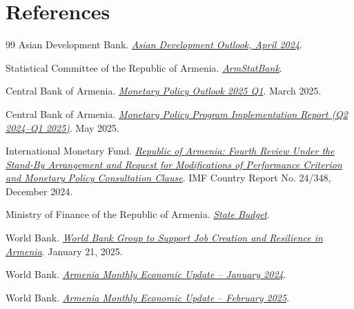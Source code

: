 \documentclass[12pt,a4paper]{report}
\begin{document}
\chapter*{References}
\begin{thebibliography}{99}
Asian Development Bank.
\href{https://www.adb.org/sites/default/files/publication/957856/asian-development-outlook-april-2024.pdf}{\textit{Asian Development Outlook, April 2024}}.

Statistical Committee of the Republic of Armenia.
\href{https://statbank.armstat.am/pxweb/en/ArmStatBank/}{\textit{ArmStatBank}}.

Central Bank of Armenia.
\href{https://www.cba.am/file_manager/Inflation-reports./MPR_2025Q1_Eng.pdf}{\textit{Monetary Policy Outlook 2025 Q1}}.
March 2025.

Central Bank of Armenia.
\href{https://www.cba.am/en/reports/8463}{\textit{Monetary Policy Program Implementation Report (Q2 2024--Q1 2025)}}.
May 2025.

International Monetary Fund.
\href{https://www.imf.org/en/Publications/CR/Issues/2024/12/17/Republic-of-Armenia-Fourth-Review-Under-the-Stand-By-Arrangement-and-Request-for-559673}{\textit{Republic of Armenia: Fourth Review Under the Stand-By Arrangement and Request for Modifications of Performance Criterion and Monetary Policy Consultation Clause}}.
IMF Country Report No. 24/348, December 2024.

Ministry of Finance of the Republic of Armenia.
\href{https://www.minfin.am/en/page/budget/}{\textit{State Budget}}.

World Bank.
\href{https://www.worldbank.org/en/news/press-release/2025/01/21/world-bank-group-to-support-job-creation-and-resilience-in-armenia}{\textit{World Bank Group to Support Job Creation and Resilience in Armenia}}.
January 21, 2025.

World Bank.
\href{https://thedocs.worldbank.org/en/doc/6b97e748ad629581293fc77a1a9030d5-0080012024/original/ARM-MEU-JAN-2024-Eng.pdf}{\textit{Armenia Monthly Economic Update -- January 2024}}.

World Bank.
\href{https://thedocs.worldbank.org/en/doc/31d4fb42e3f938e12830d2f6339c17fa-0080062025/original/ARM-MEU-FEB-2025-en.pdf}{\textit{Armenia Monthly Economic Update -- February 2025}}.


\end{thebibliography}
\end{document}
